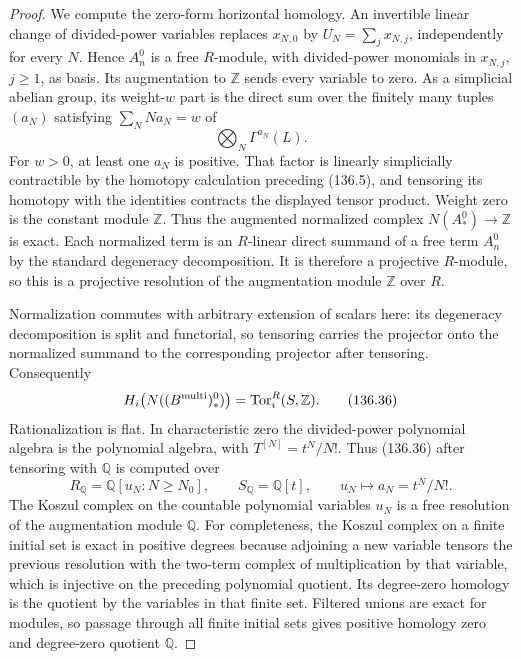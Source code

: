 \begin{proof}
We compute the zero-form horizontal homology.  An
invertible linear change of divided-power variables
replaces $x_{N,0}$ by $U_N=\sum_jx_{N,j}$, independently
for every $N$.  Hence $A_n^0$ is a free $R$-module,
with divided-power monomials in $x_{N,j}$, $j\geq1$,
as basis.  Its augmentation to $\mathbb Z$ sends every
variable to zero.  As a simplicial abelian group, its
weight-$w$ part is the direct sum over the finitely
many tuples $(a_N)$ satisfying $\sum_N N a_N=w$ of
\[
                         \bigotimes_N\Gamma^{a_N}(L).
                                                               \tag{136.35}
\]
For $w>0$, at least one $a_N$ is positive.  That factor
is linearly simplicially contractible by the homotopy
calculation preceding (136.5), and tensoring its
homotopy with the identities contracts the displayed
tensor product.  Weight zero is the constant module
$\mathbb Z$.  Thus the augmented normalized complex
$N(A_*^0)\to\mathbb Z$ is exact.  Each normalized term
is an $R$-linear direct summand of a free term $A_n^0$
by the standard degeneracy decomposition.  It is
therefore a projective $R$-module, so this is a
projective resolution of the augmentation module
$\mathbb Z$ over $R$.

Normalization commutes with arbitrary extension of
scalars here: its degeneracy decomposition is split
and functorial, so tensoring carries the projector
onto the normalized summand to the corresponding
projector after tensoring.  Consequently
\[
 H_i\bigl(N((B^{\rm multi})_*^0)\bigr)
                  =\operatorname{Tor}_i^R(S,\mathbb Z).
                                                               \tag{136.36}
\]
Rationalization is flat.  In characteristic zero the
divided-power polynomial algebra is the polynomial
algebra, with $T^{[N]}=t^N/N!$.  Thus (136.36) after
tensoring with $\mathbb Q$ is computed over
\[
 R_{\mathbb Q}=\mathbb Q[u_N:N\geq N_0],\qquad
 S_{\mathbb Q}=\mathbb Q[t],\qquad
                     u_N\longmapsto a_N=t^N/N!.
                                                               \tag{136.37}
\]
The Koszul complex on the countable polynomial
variables $u_N$ is a free resolution of the
augmentation module $\mathbb Q$.  For completeness,
the Koszul complex on a finite initial set is exact
in positive degrees because adjoining a new
variable tensors the previous resolution with the
two-term complex of multiplication by that variable,
which is injective on the preceding polynomial
quotient.  Its degree-zero homology is the quotient
by the variables in that finite set.  Filtered
unions are exact for modules, so passage through
all finite initial sets gives positive homology
zero and degree-zero quotient $\mathbb Q$.


\end{proof}
